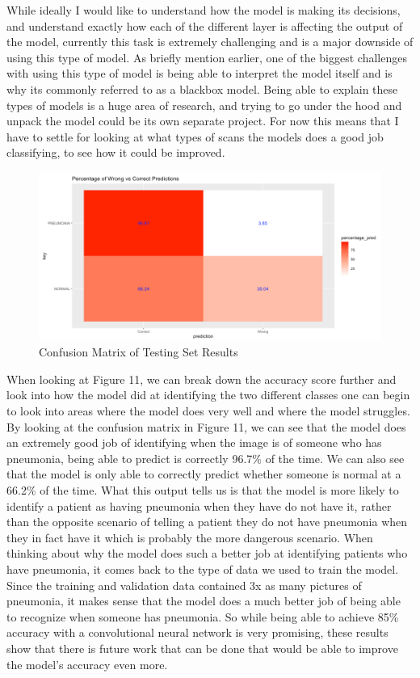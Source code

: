 \documentclass[12pt]{article}
\begin{document}
While ideally I would like to understand how the model is making its
decisions, and understand exactly how each of the different layer is
affecting the output of the model, currently this task is extremely
challenging and is a major downside of using this type of model. As
briefly mention earlier, one of the biggest challenges with using this
type of model is being able to interpret the model itself and is why its
commonly referred to as a blackbox model. Being able to explain these
types of models is a huge area of research, and trying to go under the
hood and unpack the model could be its own separate project. For now
this means that I have to settle for looking at what types of scans the
models does a good job classifying, to see how it could be improved.

\begin{figure}

{\centering \includegraphics[width=0.75\linewidth,height=0.25\textheight]{images/heatmap} 

}

\caption{Confusion Matrix of Testing Set Results}\label{fig:sample-fig11}
\end{figure}

When looking at Figure 11, we can break down the accuracy score further
and look into how the model did at identifying the two different classes
one can begin to look into areas where the model does very well and
where the model struggles. By looking at the confusion matrix in Figure
11, we can see that the model does an extremely good job of identifying
when the image is of someone who has pneumonia, being able to predict is
correctly 96.7\% of the time. We can also see that the model is only
able to correctly predict whether someone is normal at a 66.2\% of the
time. What this output tells us is that the model is more likely to
identify a patient as having pneumonia when they have do not have it,
rather than the opposite scenario of telling a patient they do not have
pneumonia when they in fact have it which is probably the more dangerous
scenario. When thinking about why the model does such a better job at
identifying patients who have pneumonia, it comes back to the type of
data we used to train the model. Since the training and validation data
contained 3x as many pictures of pneumonia, it makes sense that the
model does a much better job of being able to recognize when someone has
pneumonia. So while being able to achieve 85\% accuracy with a
convolutional neural network is very promising, these results show that
there is future work that can be done that would be able to improve the
model's accuracy even more.
\end{document}

